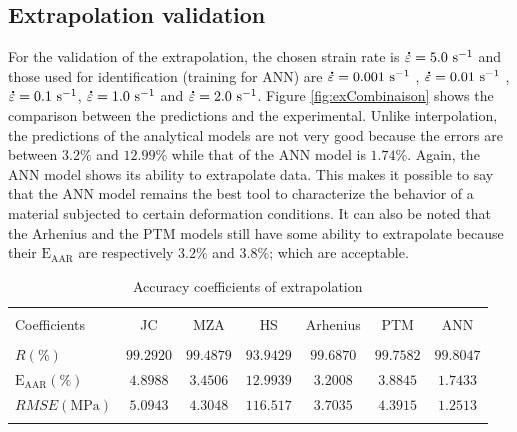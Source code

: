 \documentclass[twoside,english,1p,final,sort&compress]{elsarticle}
\theoremstyle{plain}
\newcommand{\mdot}[1]{\accentset{\mbox{\bfseries .}}{#1}}
\newcommand{\AARE}{\text{E}_\text{AAR}}
\newcommand{\ps}{\text{s}^{-1}}
\begin{document}
\subsection{Extrapolation validation}
For the validation of the extrapolation, the chosen strain rate is $\mdot\varepsilon = 5.0\ \ps$ and those used for identification (training for ANN) are $\mdot\varepsilon = 0.001\ \ps$ , $\mdot\varepsilon = 0.01\ \ps$ , $\mdot\varepsilon = 0.1\ \ps$, $\mdot\varepsilon = 1.0\ \ps$  and $\mdot\varepsilon = 2.0\ \ps$. Figure \ref{fig:exCombinaison} shows the comparison between the predictions  and the experimental. Unlike interpolation, the predictions of the analytical models are not very good because the errors are between $3.2\%$ and $12.99\%$ while that of the ANN model is $1.74\%$. Again, the ANN model shows its ability to extrapolate data. This makes it possible to say that the ANN model remains the best tool to characterize the behavior of a material subjected to certain deformation conditions. It can also be noted that the Arhenius and the PTM models still have some ability to extrapolate because their $\AARE$ are respectively $ 3.2 \% $ and $ 3.8 \%$; which are acceptable.
\begin{table}[h!]
\centering{}
\caption{Accuracy coefficients of extrapolation}
\begin{tabular}{lcccccc}
\hline
&		&		&         &             &		   &	\\
Coefficients&JC  & MZA  &HS  & Arhenius      & PTM  &ANN \\
&				&				&         &             &	&\\
\hline
$R(\%)$&$99.2920$&$99.4879$&$93.9429$&$99.6870$& $99.7582$&$99.8047$\\
$\AARE(\%)$&$4.8988$&$3.4506$&$12.9939$&$3.2008$&$3.8845$&$1.7433$\\
$RMSE(\text{MPa})$&$5.0943$&$4.3048$&$116.517$&$3.7035$&$4.3915$&$1.2513$ \\
\hline
\label{tab:exValid}
\end{tabular}
\end{table}
\end{document}
